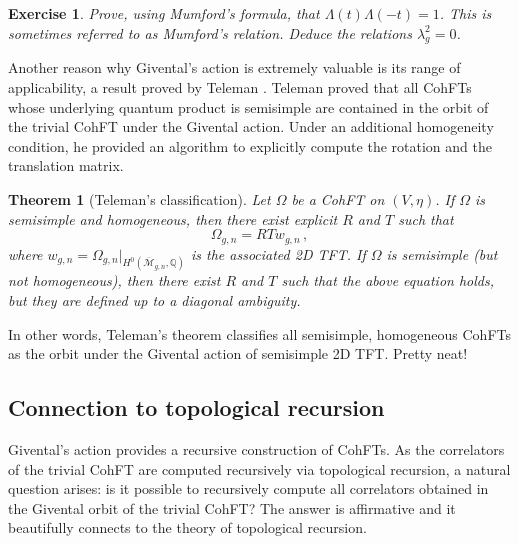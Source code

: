 \documentclass[11pt,reqno]{amsart}
\numberwithin{equation}{section}
\newcommand{\mb}[1]{\mathbb{#1}}
\newcommand{\mc}[1]{\mathcal{#1}}
\newcommand{\Q}{\mb{Q}}
\newcommand{\M}{\mc{M}}
\newcommand{\Mbar}{\overline{\M}}
\theoremstyle{plain}
\newtheorem{theorem}{Theorem}[section]
\newtheorem{exercise}{Exercise}[section]
\theoremstyle{definition}
\begin{document}
\begin{exercise}
  Prove, using Mumford's formula, that $\Lambda(t) \Lambda(-t) = 1$. This is sometimes referred to as \emph{Mumford's relation}. Deduce the relations $\lambda_g^2 = 0$.
\end{exercise}

Another reason why Givental's action is extremely valuable is its range of applicability, a result proved by Teleman \cite{Tel12}. Teleman proved that all CohFTs whose underlying quantum product is semisimple are contained in the orbit of the trivial CohFT under the Givental action. Under an additional homogeneity condition, he provided an algorithm to explicitly compute the rotation and the translation matrix.

\begin{theorem}[{Teleman's classification}]
  Let $\Omega$ be a CohFT on $(V,\eta)$. If $\Omega$ is semisimple and homogeneous, then there exist explicit $R$ and $T$ such that
  \begin{equation}
    \Omega_{g,n} = RTw_{g,n} \,,
  \end{equation}
  where $w_{g,n} = \Omega_{g,n}|_{H^0(\Mbar_{g,n},\Q)}$ is the associated 2D TFT. If $\Omega$ is semisimple (but not homogeneous), then there exist $R$ and $T$ such that the above equation holds, but they are defined up to a diagonal ambiguity.
\end{theorem}

In other words, Teleman's theorem classifies all semisimple, homogeneous CohFTs as the orbit under the Givental action of semisimple 2D TFT. Pretty neat!

\subsection{Connection to topological recursion}
Givental's action provides a recursive construction of CohFTs. As the correlators of the trivial CohFT are computed recursively via topological recursion, a natural question arises: is it possible to recursively compute all correlators obtained in the Givental orbit of the trivial CohFT? The answer is affirmative and it beautifully connects to the theory of topological recursion.
\end{document}
